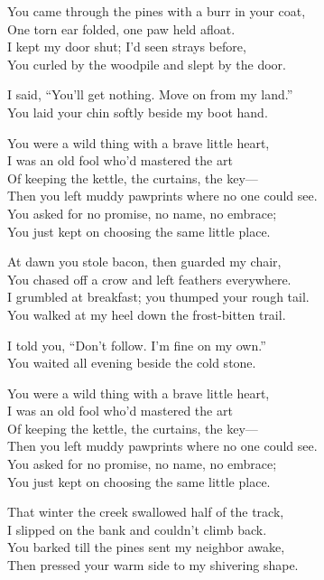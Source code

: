 \begin{lyrics}
You came through the pines with a burr in your coat,\\
One torn ear folded, one paw held afloat.\\
I kept my door shut; I’d seen strays before,\\
You curled by the woodpile and slept by the door.

I said, “You’ll get nothing. Move on from my land.”\\
You laid your chin softly beside my boot hand.

You were a wild thing with a brave little heart,\\
I was an old fool who’d mastered the art\\
Of keeping the kettle, the curtains, the key—\\
Then you left muddy pawprints where no one could see.\\
You asked for no promise, no name, no embrace;\\
You just kept on choosing the same little place.

At dawn you stole bacon, then guarded my chair,\\
You chased off a crow and left feathers everywhere.\\
I grumbled at breakfast; you thumped your rough tail.\\
You walked at my heel down the frost-bitten trail.

I told you, “Don’t follow. I’m fine on my own.”\\
You waited all evening beside the cold stone.

You were a wild thing with a brave little heart,\\
I was an old fool who’d mastered the art\\
Of keeping the kettle, the curtains, the key—\\
Then you left muddy pawprints where no one could see.\\
You asked for no promise, no name, no embrace;\\
You just kept on choosing the same little place.

That winter the creek swallowed half of the track,\\
I slipped on the bank and couldn’t climb back.\\
You barked till the pines sent my neighbor awake,\\
Then pressed your warm side to my shivering shape.


\end{lyrics}
